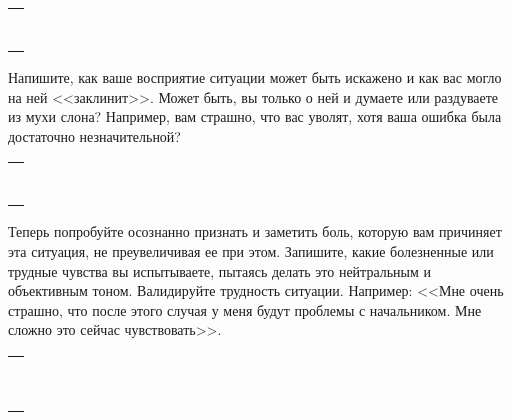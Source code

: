 \setlength{\extrarowheight}{2mm}
\begin{tabularx}{\textwidth}{X}
	\\
	\arrayrulecolor{gray}\hline\\
	\hline\\
	\hline\\
	\hline\\
	\hline\\
	\hline\\
	\hline\\
	\hline\\	
\end{tabularx}
\setlength{\extrarowheight}{0mm}

\begin{itemize}
	\itemWritingHand Напишите, как ваше восприятие ситуации может быть искажено и как вас могло на ней <<заклинит>>. Может быть, вы только о ней и думаете или раздуваете из мухи слона? Например, вам страшно, что вас уволят, хотя ваша ошибка была достаточно незначительной?
\end{itemize}

\setlength{\extrarowheight}{2mm}
\begin{tabularx}{\textwidth}{X}
	\\
	\arrayrulecolor{gray}\hline\\
	\hline\\
	\hline\\
	\hline\\
	\hline\\
	\hline\\
	\hline\\
	\hline\\	
\end{tabularx}
\setlength{\extrarowheight}{0mm}

\begin{itemize}
	\itemWritingHand Теперь попробуйте осознанно признать и заметить боль, которую вам причиняет эта ситуация, не преувеличивая ее при этом. Запишите, какие болезненные или трудные чувства вы испытываете, пытаясь делать это нейтральным и объективным тоном. Валидируйте трудность ситуации. Например: <<Мне очень страшно, что после этого случая у меня будут проблемы с начальником.  Мне сложно это сейчас чувствовать>>.
\end{itemize}

\setlength{\extrarowheight}{2mm}
\begin{tabularx}{\textwidth}{X}
	\\
	\arrayrulecolor{gray}\hline\\
	\hline\\
	\hline\\
	\hline\\
	\hline\\
	\hline\\
	\hline\\
	\hline\\
	\hline\\
	\hline\\	
\end{tabularx}
\setlength{\extrarowheight}{0mm}


